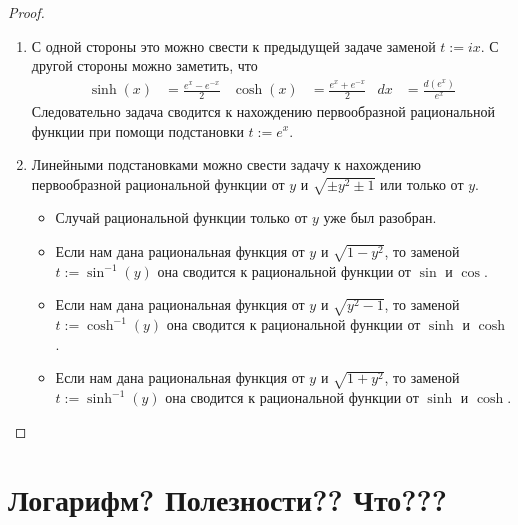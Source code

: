 \documentclass[12pt,a4paper]{article}
\begin{document}
\begin{proof}
\begin{enumerate}
            \item С одной стороны это можно свести к предыдущей задаче заменой $t := ix$. С другой стороны можно заметить, что
                \begin{align*}
                    \sinh(x) &= \frac{e^x - e^{-x}}{2}&
                    \cosh(x) &= \frac{e^x + e^{-x}}{2}&
                    dx &= \frac{d(e^x)}{e^x}
                \end{align*}
                Следовательно задача сводится к нахождению первообразной рациональной функции при помощи подстановки $t := e^x$.
            
            \item Линейными подстановками можно свести задачу к нахождению первообразной рациональной функции от $y$ и $\sqrt{\pm y^2 \pm 1}$ или только от $y$.
                \begin{itemize}
                    \item Случай рациональной функции только от $y$ уже был разобран.
                    \item Если нам дана рациональная функция от $y$ и $\sqrt{1 - y^2}$, то заменой $t := \sin^{-1}(y)$ она сводится к рациональной функции от $\sin$ и $\cos$.
                    \item Если нам дана рациональная функция от $y$ и $\sqrt{y^2 - 1}$, то заменой $t := \cosh^{-1}(y)$ она сводится к рациональной функции от $\sinh$ и $\cosh$.
                    \item Если нам дана рациональная функция от $y$ и $\sqrt{1 + y^2}$, то заменой $t := \sinh^{-1}(y)$ она сводится к рациональной функции от $\sinh$ и $\cosh$.
                \end{itemize}
        \end{enumerate}
    \end{proof}

    \section{Логарифм? Полезности?? Что???}
\end{document}
